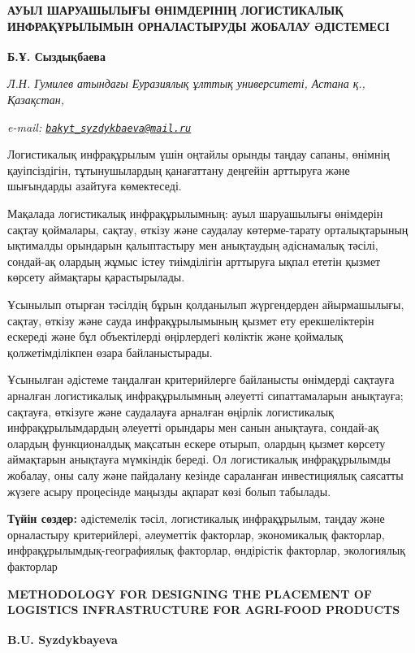 \begin{articleheader}
{\bfseries АУЫЛ ШАРУАШЫЛЫҒЫ ӨНІМДЕРІНІҢ ЛОГИСТИКАЛЫҚ ИНФРАҚҰРЫЛЫМЫН ОРНАЛАСТЫРУДЫ ЖОБАЛАУ ӘДІСТЕМЕСІ}

{\bfseries
Б.Ұ. Сыздықбаева\textsuperscript{\envelope }}
\end{articleheader}

\begin{affiliation}
\emph{Л.Н. Гумилев атындағы Еуразиялық ұлттық университеті, Астана қ., Қазақстан,}

\emph{e-mail: \href{mailto:bakyt_syzdykbaeva@mail.ru}{\nolinkurl{bakyt\_syzdykbaeva@mail.ru}}}
\end{affiliation}

Логистикалық инфрақұрылым үшін оңтайлы орынды таңдау сапаны, өнімнің
қауіпсіздігін, тұтынушылардың қанағаттану деңгейін арттыруға және
шығындарды азайтуға көмектеседі.

Мақалада логистикалық инфрақұрылымның: ауыл шаруашылығы өнімдерін сақтау
қоймалары, сақтау, өткізу және саудалау көтерме-тарату орталықтарының
ықтималды орындарын қалыптастыру мен анықтаудың әдіснамалық тәсілі,
сондай-ақ олардың жұмыс істеу тиімділігін арттыруға ықпал ететін қызмет
көрсету аймақтары қарастырылады.

Ұсынылып отырған тәсілдің бұрын қолданылып жүргендерден айырмашылығы,
сақтау, өткізу және сауда инфрақұрылымының қызмет ету ерекшеліктерін
ескереді және бұл объектілерді өңірлердегі көліктік және қоймалық
қолжетімділікпен өзара байланыстырады.

Ұсынылған әдістеме таңдалған критерийлерге байланысты өнімдерді сақтауға
арналған логистикалық инфрақұрылымның әлеуетті сипаттамаларын анықтауға;
сақтауға, өткізуге және саудалауға арналған өңірлік логистикалық
инфрақұрылымдардың әлеуетті орындары мен санын анықтауға, сондай-ақ
олардың функционалдық мақсатын ескере отырып, олардың қызмет көрсету
аймақтарын анықтауға мүмкіндік береді. Ол логистикалық инфрақұрылымды
жобалау, оны салу және пайдалану кезінде сараланған инвестициялық
саясатты жүзеге асыру процесінде маңызды ақпарат көзі болып табылады.

{\bfseries Түйін сөздер:} әдістемелік тәсіл, логистикалық инфрақұрылым,
таңдау және орналастыру критерийлері, әлеуметтік факторлар, экономикалық
факторлар, инфрақұрылымдық-географиялық факторлар, өндірістік факторлар,
экологиялық факторлар

\begin{articleheader}
{\bfseries METHODOLOGY FOR DESIGNING THE PLACEMENT OF LOGISTICS INFRASTRUCTURE FOR AGRI-FOOD PRODUCTS}

{\bfseries
B.U. Syzdykbayeva\textsuperscript{\envelope }}
\end{articleheader}

